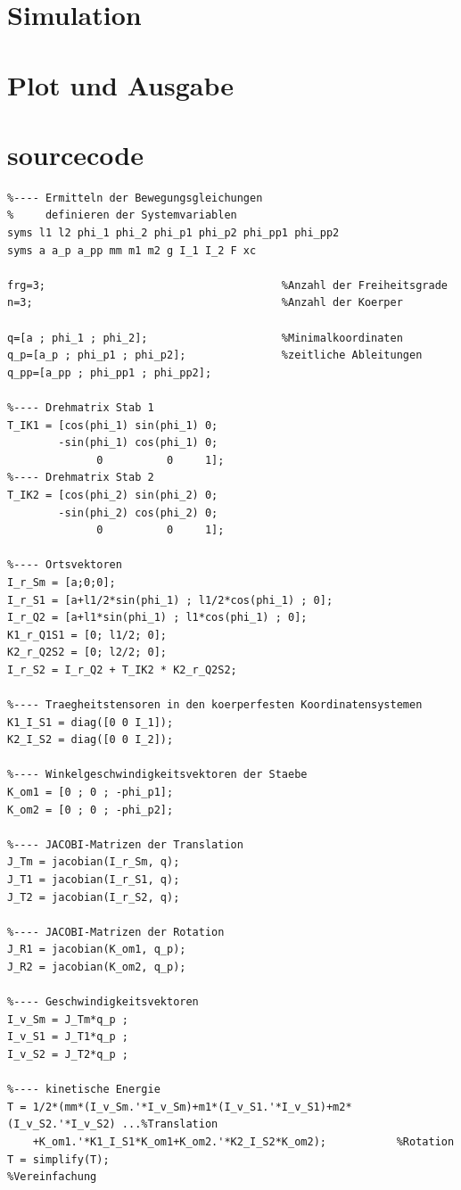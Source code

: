 \documentclass[a4paper, 10pt]{report}
\begin{document}
\section{Simulation}
\section{Plot und Ausgabe}
\section{sourcecode}

\begin{lstlisting}
%---- Ermitteln der Bewegungsgleichungen
%     definieren der Systemvariablen
syms l1 l2 phi_1 phi_2 phi_p1 phi_p2 phi_pp1 phi_pp2
syms a a_p a_pp mm m1 m2 g I_1 I_2 F xc

frg=3;                                     %Anzahl der Freiheitsgrade
n=3;                                       %Anzahl der Koerper

q=[a ; phi_1 ; phi_2];                     %Minimalkoordinaten
q_p=[a_p ; phi_p1 ; phi_p2];               %zeitliche Ableitungen
q_pp=[a_pp ; phi_pp1 ; phi_pp2];

%---- Drehmatrix Stab 1
T_IK1 = [cos(phi_1) sin(phi_1) 0;
        -sin(phi_1) cos(phi_1) 0;
              0          0     1];
%---- Drehmatrix Stab 2
T_IK2 = [cos(phi_2) sin(phi_2) 0;
        -sin(phi_2) cos(phi_2) 0;
              0          0     1];

%---- Ortsvektoren
I_r_Sm = [a;0;0];
I_r_S1 = [a+l1/2*sin(phi_1) ; l1/2*cos(phi_1) ; 0];
I_r_Q2 = [a+l1*sin(phi_1) ; l1*cos(phi_1) ; 0];
K1_r_Q1S1 = [0; l1/2; 0];
K2_r_Q2S2 = [0; l2/2; 0];
I_r_S2 = I_r_Q2 + T_IK2 * K2_r_Q2S2;

%---- Traegheitstensoren in den koerperfesten Koordinatensystemen
K1_I_S1 = diag([0 0 I_1]);
K2_I_S2 = diag([0 0 I_2]);

%---- Winkelgeschwindigkeitsvektoren der Staebe
K_om1 = [0 ; 0 ; -phi_p1];
K_om2 = [0 ; 0 ; -phi_p2];

%---- JACOBI-Matrizen der Translation
J_Tm = jacobian(I_r_Sm, q);
J_T1 = jacobian(I_r_S1, q);
J_T2 = jacobian(I_r_S2, q);

%---- JACOBI-Matrizen der Rotation
J_R1 = jacobian(K_om1, q_p);
J_R2 = jacobian(K_om2, q_p);

%---- Geschwindigkeitsvektoren
I_v_Sm = J_Tm*q_p ;
I_v_S1 = J_T1*q_p ; 
I_v_S2 = J_T2*q_p ;

%---- kinetische Energie
T = 1/2*(mm*(I_v_Sm.'*I_v_Sm)+m1*(I_v_S1.'*I_v_S1)+m2*(I_v_S2.'*I_v_S2) ...%Translation
    +K_om1.'*K1_I_S1*K_om1+K_om2.'*K2_I_S2*K_om2);           %Rotation
T = simplify(T);                                             %Vereinfachung


\end{lstlisting}
\end{document}
